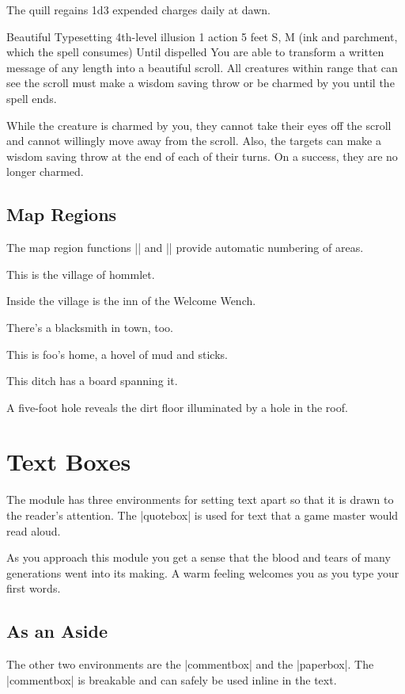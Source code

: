 \documentclass[letterpaper,twocolumn,openany]{dndbook}
\begin{document}
	The quill regains 1d3 expended charges daily at dawn.
	
	\spellheader%
	{Beautiful Typesetting}
	{4th-level illusion}
	{1 action}
	{5 feet}
	{S, M (ink and parchment, which the spell consumes)}
	{Until dispelled}
	You are able to transform a written message of any length into a beautiful scroll. All creatures within range that can see the scroll must make a wisdom saving throw or be charmed by you until the spell ends.
	
	While the creature is charmed by you, they cannot take their eyes off the scroll and cannot willingly move away from the scroll. Also, the targets can make a wisdom saving throw at the end of each of their turns. On a success, they are no longer charmed.
	
	\section{Map Regions}
	The map region functions |\area| and |\subarea| provide automatic numbering of areas.
	
	This is the village of hommlet.
	
	Inside the village is the inn of the Welcome Wench.
	
	There's a blacksmith in town, too.
	
	This is foo's home, a hovel of mud and sticks.
	
	This ditch has a board spanning it.
	
	A five-foot hole reveals the dirt floor illuminated by a hole in the roof.
	
	\chapter{Text Boxes}
	
	The module has three environments for setting text apart so that it is drawn to the reader's attention. The |quotebox| is used for text that a game master would read aloud.
	
	\begin{quotebox}
		As you approach this module you get a sense that the blood and tears of many generations went into its making. A warm feeling welcomes you as you type your first words.
	\end{quotebox}
	
	\section{As an Aside}
	The other two environments are the |commentbox| and the |paperbox|. The |commentbox| is breakable and can safely be used inline in the text.
	
\end{document}
